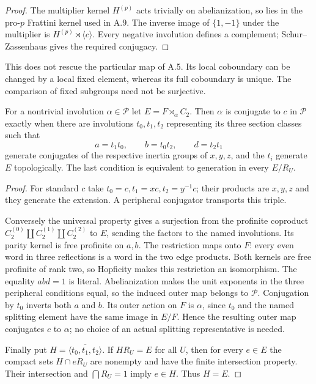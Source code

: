 \begin{proof}
The multiplier kernel \(H^{(p)}\) acts trivially
on abelianization, so lies in the pro-\(p\)
Frattini kernel used in A.9. The inverse image
of \(\{1,-1\}\) under the multiplier is
\(H^{(p)}\rtimes\langle c\rangle\).
Every negative involution defines a complement;
Schur--Zassenhaus gives the required conjugacy.
\end{proof}

This does not rescue the particular map of A.5.
Its local coboundary can be changed by a local
fixed element, whereas its full coboundary is
unique. The comparison of fixed subgroups
need not be surjective.

For a nontrivial involution \(\alpha\in\mathcal P\)
let \(E=F\rtimes_\alpha C_2\). Then \(\alpha\)
is conjugate to \(c\) in \(\mathcal P\) exactly
when there are involutions \(t_0,t_1,t_2\)
representing its three section classes such that
\[
 a=t_1t_0,\qquad b=t_0t_2,\qquad d=t_2t_1
\]
generate conjugates of the respective inertia
groups of \(x,y,z\), and the \(t_i\) generate
\(E\) topologically. The last condition is
equivalent to generation in every \(E/R_U\).

\begin{proof}
For standard \(c\) take
\(t_0=c,t_1=xc,t_2=y^{-1}c\); their products
are \(x,y,z\) and they generate the extension.
A peripheral conjugator transports this triple.

Conversely the universal property gives a
surjection from the profinite coproduct
\(C_2^{(0)}\amalg C_2^{(1)}\amalg C_2^{(2)}\)
to \(E\), sending the factors to the named
involutions. Its parity kernel is free
profinite on \(a,b\). The restriction maps
onto \(F\): every even word in three
reflections is a word in the two edge products.
Both kernels are free profinite of rank two,
so Hopficity makes this restriction an
isomorphism. The equality \(abd=1\) is literal.
Abelianization makes the unit exponents in
the three peripheral conditions equal,
so the induced outer map belongs to \(\mathcal P\).
Conjugation by \(t_0\) inverts both \(a\) and \(b\).
Its outer action on \(F\) is \(\alpha\), since
\(t_0\) and the named splitting element have the
same image in \(E/F\). Hence the resulting outer
map conjugates \(c\) to \(\alpha\); no choice of
an actual splitting representative is needed.

Finally put \(H=\overline{\langle t_0,t_1,t_2\rangle}\).
If \(HR_U=E\) for all \(U\), then for every \(e\in E\)
the compact sets \(H\cap eR_U\) are nonempty
and have the finite intersection property.
Their intersection and \(\bigcap R_U=1\)
imply \(e\in H\). Thus \(H=E\).
\end{proof}

